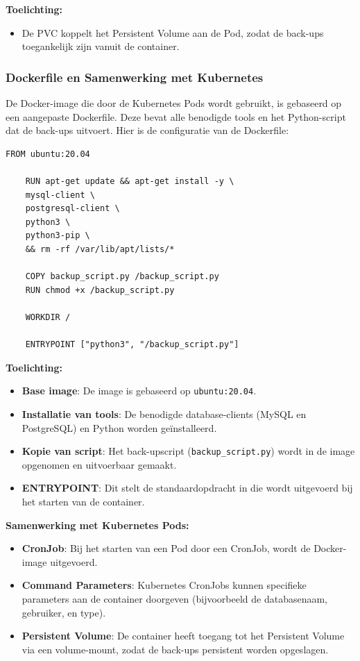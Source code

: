 \textbf{Toelichting:}
\begin{itemize}
    \item De PVC koppelt het Persistent Volume aan de Pod, zodat de back-ups toegankelijk zijn vanuit de container.
\end{itemize}

\subsubsection{Dockerfile en Samenwerking met Kubernetes}

De Docker-image die door de Kubernetes Pods wordt gebruikt, is gebaseerd op een aangepaste Dockerfile. Deze bevat alle benodigde tools en het Python-script dat de back-ups uitvoert. Hier is de configuratie van de Dockerfile:

\begin{lstlisting}[language=docker, caption=Dockerfile Configuratie]
    FROM ubuntu:20.04
    
    RUN apt-get update && apt-get install -y \
    mysql-client \
    postgresql-client \
    python3 \
    python3-pip \
    && rm -rf /var/lib/apt/lists/*
    
    COPY backup_script.py /backup_script.py
    RUN chmod +x /backup_script.py
    
    WORKDIR /
    
    ENTRYPOINT ["python3", "/backup_script.py"]
\end{lstlisting}

\textbf{Toelichting:}
\begin{itemize}
    \item \textbf{Base image}: De image is gebaseerd op \texttt{ubuntu:20.04}.
    \item \textbf{Installatie van tools}: De benodigde database-clients (MySQL en PostgreSQL) en Python worden geïnstalleerd.
    \item \textbf{Kopie van script}: Het back-upscript (\texttt{backup\_script.py}) wordt in de image opgenomen en uitvoerbaar gemaakt.
    \item \textbf{ENTRYPOINT}: Dit stelt de standaardopdracht in die wordt uitgevoerd bij het starten van de container.
\end{itemize}

\textbf{Samenwerking met Kubernetes Pods:}
\begin{itemize}
    \item \textbf{CronJob}: Bij het starten van een Pod door een CronJob, wordt de Docker-image uitgevoerd.
    \item \textbf{Command Parameters}: Kubernetes CronJobs kunnen specifieke parameters aan de container doorgeven (bijvoorbeeld de databasenaam, gebruiker, en type).
    \item \textbf{Persistent Volume}: De container heeft toegang tot het Persistent Volume via een volume-mount, zodat de back-ups persistent worden opgeslagen.
\end{itemize}

